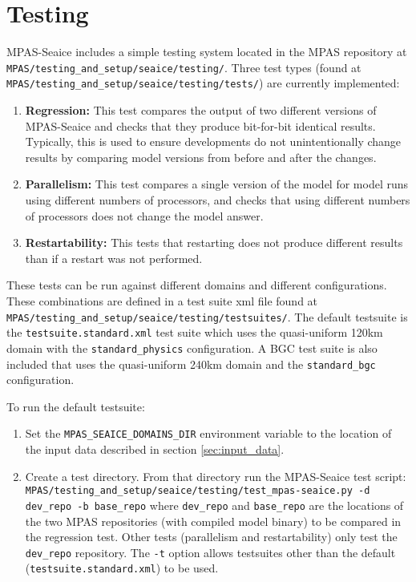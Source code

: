 \section{Testing}
\label{sec:testing}

MPAS-Seaice includes a simple testing system located in the MPAS repository at \lstinline+MPAS/testing_and_setup/seaice/testing/+. Three test types (found at \lstinline+MPAS/testing_and_setup/seaice/testing/tests/+) are currently implemented:
\begin{enumerate}

\item \textbf{Regression:} This test compares the output of two different versions of MPAS-Seaice and checks that they produce bit-for-bit identical results. Typically, this is used to ensure developments do not unintentionally change results by comparing model versions from before and after the changes. 

\item \textbf{Parallelism:} This test compares a single version of the model for model runs using different numbers of processors, and checks that using different numbers of processors does not change the model answer.

\item \textbf{Restartability:} This tests that restarting does not produce different results than if a restart was not performed.

\end{enumerate}

These tests can be run against different domains and different configurations. These combinations are defined in a test suite xml file found at \lstinline+MPAS/testing_and_setup/seaice/testing/testsuites/+. The default testsuite is the \lstinline+testsuite.standard.xml+ test suite which uses the quasi-uniform 120km domain with the \lstinline+standard_physics+ configuration. A BGC test suite is also included that uses the quasi-uniform 240km domain and the \lstinline+standard_bgc+ configuration.

To run the default testsuite:

\begin{enumerate}

\item Set the \lstinline+MPAS_SEAICE_DOMAINS_DIR+ environment variable to the location of the input data described in section \ref{sec:input_data}.

\item Create a test directory. From that directory run the MPAS-Seaice test script: \lstinline+MPAS/testing_and_setup/seaice/testing/test_mpas-seaice.py -d dev_repo -b base_repo+ where \lstinline+dev_repo+ and \lstinline+base_repo+ are the locations of the two MPAS repositories (with compiled model binary) to be compared in the regression test. Other tests (parallelism and restartability) only test the \lstinline+dev_repo+ repository. The \lstinline+-t+ option allows testsuites other than the default (\lstinline+testsuite.standard.xml+) to be used.

\end{enumerate}

